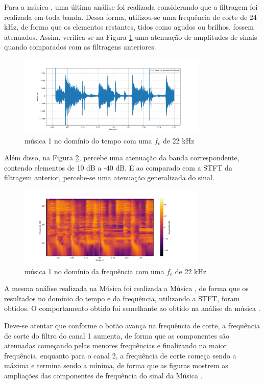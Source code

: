 Para a música \cite{track01}, uma última análise foi realizada considerando que a filtragem foi realizada em toda banda. Dessa forma, utilizou-se uma frequência de corte de 24 kHz, de forma que os elementos restantes, tidos como agudos ou brilhos, fossem atenuados. Assim, verifica-se na Figura \ref{fig30} uma atenuação de amplitudes de sinais quando comparados com as filtragens anteriores.

\begin{figure}[h]
	\centering
    \includegraphics[width=0.8\textwidth]{figuras/fig30.png}
	\caption{música 1 no domínio do tempo com uma $f_c$ de 22 kHz}
	\label{fig30}
\end{figure}

Além disso, na Figura \ref{fig31}, percebe uma atenuação da banda correspondente, contendo elementos de 10 dB a -40 dB. E ao comparado com a STFT da filtragem anterior, percebe-se uma atenuação generalizada do sinal.

\begin{figure}[h]
	\centering
    \includegraphics[width=0.8\textwidth]{figuras/fig31.png}
	\caption{música 1 no domínio da frequência com uma $f_c$ de 22 kHz}
	\label{fig31}
\end{figure}

A mesma análise realizada na Música \cite{track01} foi realizada a Música \cite{track02}, de forma que os resultados no domínio do tempo e da frequência, utilizando a STFT, foram obtidos. O comportamento obtido foi semelhante ao obtido na análise da música \cite{track01}.

Deve-se atentar que conforme o botão avança na frequência de corte, a frequência de corte do filtro do canal 1 aumenta, de forma que as componentes são atenuadas começando pelas menores frequências e finalizando na maior frequência, enquanto para o canal 2, a frequência de corte começa sendo a máxima e termina sendo a mínima, de forma que as figuras mostrem as ampliações das componentes de frequência do sinal da Música \cite{track02}.


